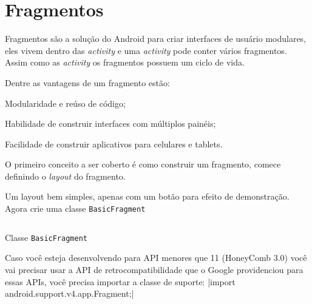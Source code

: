 \documentclass[a4paper,12pt,brazil,oneside]{book}
\begin{document}
\section{Fragmentos}
\label{sec:frags}

Fragmentos são a solução do Android para criar interfaces de usuário modulares, eles vivem dentro das \emph{activity} e uma \emph{activity} pode conter vários fragmentos. Assim como as \emph{activity} os fragmentos possuem um ciclo de vida. %

Dentre as vantagens de um fragmento estão:
\bi
	\item Modularidade e reúso de código;
	\item Habilidade de construir interfaces com múltiplos painéis;
	\item Facilidade de construir aplicativos para celulares e tablets.
\ei

O primeiro conceito a ser coberto é como construir um fragmento, comece definindo o \emph{layout} do fragmento.

Um layout bem simples, apenas com um botão para efeito de demonstração. Agora crie uma classe \texttt{BasicFragment}

\begin{listing}[H]
\inputminted[linenos=true,fontsize=\small,frame=lines, framesep=2mm, tabsize=2,numbersep=5pt]{java}{src/design/basicfragment.java}
\caption{Classe \texttt{BasicFragment}}
\end{listing}	

Caso você esteja desenvolvendo para API menores que 11 (HoneyComb 3.0) você vai precisar usar a API de retrocompatibilidade que o Google providenciou para essas APIs, você precisa importar a classe de suporte: |import android.support.v4.app.Fragment;|


\end{document}

